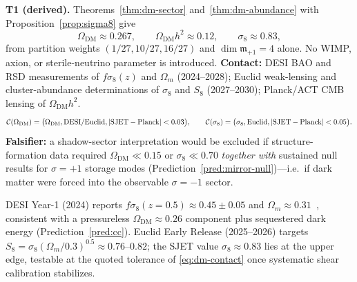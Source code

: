 \begin{prediction}\label{pred:dm}
\textbf{T1 (derived).} Theorems~\ref{thm:dm-sector} and~\ref{thm:dm-abundance}
with Proposition~\ref{prop:sigma8} give
\begin{equation}\label{eq:pred-dm}
  \Omega_{\mathrm{DM}}\approx 0.267,
  \qquad
  \Omega_{\mathrm{DM}}h^2\approx 0.12,
  \qquad
  \sigma_8\approx 0.83,
\end{equation}
from partition weights $(1/27,10/27,16/27)$ and $\dim\mathfrak{m}_{+1}=4$ alone.
No WIMP, axion, or sterile-neutrino parameter is introduced.
\textbf{Contact:} DESI BAO and RSD measurements of
$f\sigma_8(z)$ and $\Omega_m$ (2024--2028); Euclid weak-lensing and
cluster-abundance determinations of $\sigma_8$ and $S_8$ (2027--2030);
Planck/ACT CMB lensing of $\Omega_{\mathrm{DM}}h^2$.
\begin{equation}\label{eq:dm-contact}
  \mathcal{C}(\Omega_{\mathrm{DM}})
  =\bigl(\Omega_{\mathrm{DM}},\mathrm{DESI/Euclid},|{\rm SJET}-{\rm Planck}|<0.03\bigr),
  \qquad
  \mathcal{C}(\sigma_8)
  =\bigl(\sigma_8,\mathrm{Euclid},|{\rm SJET}-{\rm Planck}|<0.05\bigr).
\end{equation}
\textbf{Falsifier:} a shadow-sector interpretation would be excluded if
structure-formation data required $\Omega_{\mathrm{DM}}\ll 0.15$ or
$\sigma_8\ll 0.70$ \emph{together with} sustained null results for
$\sigma=+1$ storage modes (Prediction~\ref{pred:mirror-null})---i.e.\ if dark
matter were forced into the observable $\sigma=-1$ sector.
\end{prediction}

\begin{remark}
DESI Year-1 (2024) reports $f\sigma_8(z=0.5)\approx 0.45\pm0.05$ and
$\Omega_m\approx 0.31$~\cite{DESI2024}, consistent with a pressureless
$\Omega_{\mathrm{DM}}\approx 0.26$ component plus sequestered dark energy
(Prediction~\ref{pred:cc}). Euclid Early Release (2025--2026) targets
$S_8=\sigma_8(\Omega_m/0.3)^{0.5}\approx 0.76$--$0.82$; the SJET value
$\sigma_8\approx 0.83$ lies at the upper edge, testable at the quoted
tolerance of \eqref{eq:dm-contact} once systematic shear calibration
stabilizes.
\end{remark}


